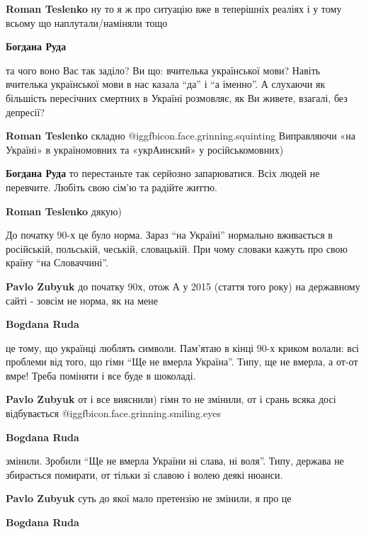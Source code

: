 \begin{itemize}
\begin{itemize}
\textbf{Roman Teslenko} ну то я ж про ситуацію вже в теперішніх реаліях і у тому всьому що наплутали/наміняли тощо

\textbf{Богдана Руда} 

та чого воно Вас так заділо? Ви що: вчителька української мови? Навіть
вчителька української мови в нас казала \enquote{да} і \enquote{а іменно}. А слухаючи як
більшість пересічних смертних в Україні розмовляє, як Ви живете, взагалі, без
депресії?

\textbf{Roman Teslenko} складно @igg{fbicon.face.grinning.squinting} 
Виправляючи «на Україні» в україномовних та «укрАинский» у російськомовних)

\textbf{Богдана Руда} то перестаньте так серйозно запарюватися. Всіх людей не перевчите. Любіть свою сім'ю та радійте життю.


\textbf{Roman Teslenko} дякую)
\end{itemize} %


До початку 90-х це було норма. Зараз \enquote{на Україні} нормально вживається в
російській, польській, чеській, словацькій. При чому словаки кажуть про свою
країну \enquote{на Словаччині}.

\begin{itemize} %
\textbf{Pavlo Zubyuk} до початку 90х, отож
А у 2015 (стаття того року) на державному сайті - зовсім не норма, як на мене

\textbf{Bogdana Ruda} 

це тому, що українці люблять символи. Пам'ятаю в кінці 90-х криком волали: всі
проблеми від того, що гімн \enquote{Ще не вмерла Україна}. Типу, ще не вмерла, а от-от
вмре! Треба поміняти і все буде в шоколаді.


\textbf{Pavlo Zubyuk} от і все вияснили) гімн то не змінили, от і срань всяка досі відбувається @igg{fbicon.face.grinning.smiling.eyes} 

\textbf{Bogdana Ruda} 

змінили. Зробили \enquote{Ще не вмерла України ні слава, ні воля}. Типу,
держава не збирається помирати, от тільки зі славою і волею деякі нюанси.

\textbf{Pavlo Zubyuk} суть до якої мало претензію не змінили, я про це

\textbf{Bogdana Ruda} 


\end{itemize}
\end{itemize}
